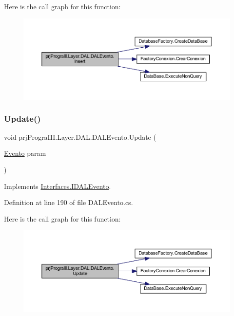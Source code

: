 Here is the call graph for this function\+:
\nopagebreak
\begin{figure}[H]
\begin{center}
\leavevmode
\includegraphics[width=350pt]{classprj_progra_i_i_i_1_1_layer_1_1_d_a_l_1_1_d_a_l_evento_a0bc4cec389945eb6f5f796c63616d032_cgraph}
\end{center}
\end{figure}
\hypertarget{classprj_progra_i_i_i_1_1_layer_1_1_d_a_l_1_1_d_a_l_evento_a173c20de2fec58a207baa8204cbcaefd}{}\label{classprj_progra_i_i_i_1_1_layer_1_1_d_a_l_1_1_d_a_l_evento_a173c20de2fec58a207baa8204cbcaefd} 
\subsubsection{\texorpdfstring{Update()}{Update()}}
{\footnotesize\ttfamily void prj\+Progra\+I\+I\+I.\+Layer.\+D\+A\+L.\+D\+A\+L\+Evento.\+Update (\begin{DoxyParamCaption}\item[{\hyperlink{classprj_progra_i_i_i_1_1_layer_1_1_entities_1_1_evento}{Evento}}]{param }\end{DoxyParamCaption})}



Implements \hyperlink{interface_interfaces_1_1_i_d_a_l_evento_a891007642c180aaf3224fd217361bd7b}{Interfaces.\+I\+D\+A\+L\+Evento}.



Definition at line 190 of file D\+A\+L\+Evento.\+cs.

Here is the call graph for this function\+:
\nopagebreak
\begin{figure}[H]
\begin{center}
\leavevmode
\includegraphics[width=350pt]{classprj_progra_i_i_i_1_1_layer_1_1_d_a_l_1_1_d_a_l_evento_a173c20de2fec58a207baa8204cbcaefd_cgraph}
\end{center}
\end{figure}


